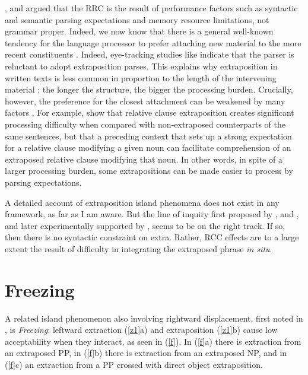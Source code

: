 \documentclass[output=paper,biblatex,babelshorthands,newtxmath,draftmode,colorlinks,citecolor=brown]{langscibook}
\begin{document}
\citet{grosurrc}, \citet{gazdar} and \citet{stucky} argued that the RRC is the result of performance
factors such as syntactic and semantic parsing expectations and memory resource limitations, not
grammar proper.  Indeed, we now know that there is a general well-known tendency for the language
processor to prefer attaching new material to the more recent constituents
\citep{frazcl,gibetal,trax98,fodor02b,fernandez03}.  Indeed, eye-tracking studies like \citet{hnps}
indicate that the parser is reluctant to adopt extraposition parses.  This explains why
extraposition in written texts is less common in proportion to the length of the intervening
material \citep{UBDKKOS98b}: the longer the structure, the bigger the processing burden.  Crucially,
however, the preference for the closest attachment can be weakened by many factors
\citep{fernandez03,desmet,devic,carreras}.  For example, \citet{levyted} show that relative clause
extraposition creates significant processing difficulty when compared with non-extraposed
counterparts of the same sentences, but that a preceding context that sets up a strong expectation
for a relative clause modifying a given noun can facilitate comprehension of an extraposed relative
clause modifying that noun.  In other words, in spite of a larger processing burden, some
extrapositions can be made easier to process by parsing expectations.

A detailed account of extraposition island phenomena does not exist in any framework, as far as I am
aware. But the line of inquiry first proposed by \citet{grosurrc}, \citet{gazdar} and
\citet{stucky}, and later experimentally supported by \citet{levyted}, \citet{SS2013b-u} seems to be
on the right track. If so, then there is no syntactic constraint on {\sc extra}. Rather, RCC effects
are to a large extent the result of difficulty in integrating the extraposed phrase \emph{in situ}.

\section{Freezing}

A related island phenomenon also involving rightward displacement, first noted in
\citet[305]{Ross67}, is \emph{Freezing}: leftward extraction (\ref{z1}a) and extraposition
(\ref{z1}b) cause low acceptability when they interact, as seen in (\ref{f}). In (\ref{f}a) there is
extraction from an extraposed PP, in (\ref{f}b) there is extraction from an extraposed NP, and in
(\ref{f}c) an extraction from a PP crossed with direct object extraposition.
 
\end{document}
